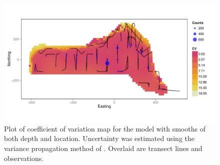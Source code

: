 \documentclass[a4paper,12pt]{article}
\begin{document}
\begin{figure}[h!]
  \caption{Plot of coefficient of variation map for the model with smooths of both depth and location. Uncertainty was estimated using the variance propagation method of \cite{WILLIAMS:2011in}. Overlaid are transect lines and observations.}
  \label{cv-plot}
  \begin{center}
    \includegraphics[width=\textwidth]{figs/cvplot-varprop}
  \end{center}
\end{figure}

\newpage
\end{document}
